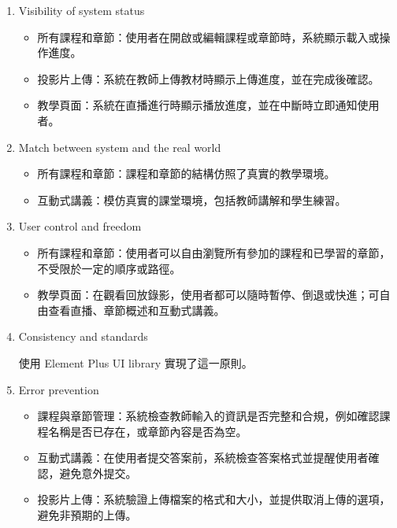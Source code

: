 \documentclass[12pt]{article}
\begin{document}
\begin{enumerate}[label=(\arabic*)]
  \setlength{\parindent}{2em}
  
  \item Visibility of system status

  \begin{itemize}
    \item 所有課程和章節：使用者在開啟或編輯課程或章節時，系統顯示載入或操作進度。
    \item 投影片上傳：系統在教師上傳教材時顯示上傳進度，並在完成後確認。
    \item 教學頁面：系統在直播進行時顯示播放進度，並在中斷時立即通知使用者。
  \end{itemize}

  \item Match between system and the real world

  \begin{itemize}
    \item 所有課程和章節：課程和章節的結構仿照了真實的教學環境。
    \item 互動式講義：模仿真實的課堂環境，包括教師講解和學生練習。
  \end{itemize}

  \item User control and freedom

  \begin{itemize}
    \item 所有課程和章節：使用者可以自由瀏覽所有參加的課程和已學習的章節，不受限於一定的順序或路徑。
    \item 教學頁面：在觀看回放錄影，使用者都可以隨時暫停、倒退或快進；可自由查看直播、章節概述和互動式講義。
  \end{itemize}

  \item Consistency and standards

  \par 使用 Element Plus UI library 實現了這一原則。

  \item Error prevention

  \begin{itemize}
    \item 課程與章節管理：系統檢查教師輸入的資訊是否完整和合規，例如確認課程名稱是否已存在，或章節內容是否為空。
    \item 互動式講義：在使用者提交答案前，系統檢查答案格式並提醒使用者確認，避免意外提交。
    \item 投影片上傳：系統驗證上傳檔案的格式和大小，並提供取消上傳的選項，避免非預期的上傳。
  \end{itemize}


\end{enumerate}
\end{document}
